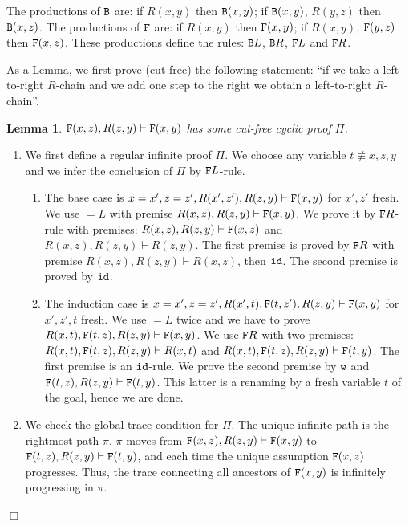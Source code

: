 \documentclass[a4paper,12pt]{article}
\newtheorem{lemma}[theorem]{Lemma}
\newenvironment{proof}[1][Proof]{\begin{trivlist}
\item[\hskip \labelsep {\bfseries #1}]}{\end{trivlist}}
\newcommand{\Backward}         { {\tt B} }
\newcommand{\Forward}         { {\tt F} }
\newcommand{\id}              { {\tt id} }
\newcommand{\eqL}     {= \! \!  \!  L}
\newcommand{\Weak} { {\tt w} }
\begin{document}
The productions of $\Backward$ are: if $R(x,y)$ then $\Backward(x,y)$; if $\Backward(x,y)$, $R(y,z)$ then $\Backward(x,z)$.  
The productions of $\Forward$ are: if $R(x,y)$ then $\Forward(x,y)$; if $R(x,y)$, $\Forward(y,z)$ then $\Forward(x,z)$.  These productions define the rules: $\Backward L$, $\Backward R$, $\Forward L$ and $\Forward R$.


As a Lemma, we first prove (cut-free) the following statement: ``if we take a left-to-right $R$-chain and we add one step to the right we obtain a left-to-right $R$-chain''. 

\begin{lemma}
\label{lemma-premise-cut}
$\Forward(x,z), R(z,y) \vdash \Forward(x,y)$ has some cut-free cyclic proof $\Pi$. 
\end{lemma}

\begin{proof}
\begin{enumerate}
\item
We first define a regular infinite proof $\Pi$. We choose any variable $t \not \equiv x,z,y$ and we infer the conclusion of $\Pi$ by $\Forward L$-rule.
\begin{enumerate}
\item
The base case is $x=x', z=z', R(x',z'), R(z,y) \vdash \Forward(x,y)$ for $x',z'$ fresh. We use $\eqL$ with premise $R(x,z), R(z,y) \vdash \Forward(x,y)$. We prove it by $\Forward R$-rule with premises:  $R(x,z), R(z,y) \vdash \Forward(x,z)$ and $R(x,z), R(z,y) \vdash R(z,y)$. The first premise is proved by $\Forward R$ with premise $R(x,z), R(z,y) \vdash R(x,z)$, then $\id$. The second premise is proved by $\id$.
\item
The induction case is $x=x', z=z', R(x',t), \Forward(t,z'), R(z,y) \vdash \Forward(x,y)$  for $x',z',t$ fresh. We use $\eqL$ twice and we have to prove $R(x,t), \Forward(t,z), R(z,y) \vdash \Forward(x,y)$. We use $\Forward R$ with two premises: $R(x,t), \Forward(t,z), R(z,y) \vdash R(x,t)$ and $R(x,t), \Forward(t,z), R(z,y) \vdash \Forward(t,y)$. The first premise is an $\id$-rule. We prove the second premise by $\Weak$ and $\Forward(t,z), R(z,y) \vdash \Forward(t,y)$. This latter is a renaming by a fresh variable $t$ of the goal, hence we are done.
\end{enumerate}
\item
We check the global trace condition for $\Pi$. The unique infinite path is the rightmost path $\pi$. $\pi$ moves from $\Forward(x,z), R(z,y) \vdash \Forward(x,y)$ to $\Forward(t,z), R(z,y) \vdash \Forward(t,y)$, and each time the unique assumption $\Forward(x,z)$ progresses. Thus, the trace connecting all ancestors of $\Forward(x,y)$  is infinitely progressing in $\pi$.
\end{enumerate}
$\Box$ \end{proof}
\end{document}

